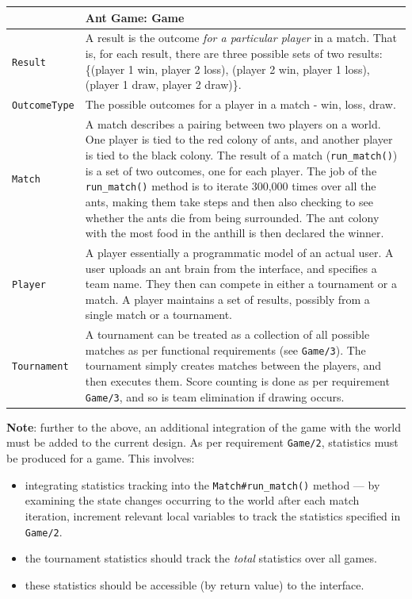 \documentclass[11pt]{article}
\begin{document}
\begin{longtable}[c]{@{}p{}p{}@{}}
\toprule
& Ant Game: Game \tabularnewline
\midrule
\texttt{Result} & A result is the outcome \textit{for a particular player} in a match. That is, for each result, there are three possible sets of two results: \{(player 1 win, player 2 loss), (player 2 win, player 1 loss), (player 1 draw, player 2 draw)\}. \tabularnewline
\texttt{OutcomeType} & The possible outcomes for a player in a match - win, loss, draw. \tabularnewline
\texttt{Match} & A match describes a pairing between two players on a world. One player is tied to the red colony of ants, and another player is tied to the black colony. The result of a match (\texttt{run\_match()}) is a set of two outcomes, one for each player. The job of the \texttt{run\_match()} method is to iterate 300,000 times over all the ants, making them take steps and then also checking to see whether the ants die from being surrounded. The ant colony with the most food in the anthill is then declared the winner. \tabularnewline
\texttt{Player} & A player essentially a programmatic model of an actual user. A user uploads an ant brain from the interface, and specifies a team name. They then can compete in either a tournament or a match. A player maintains a set of results, possibly from a single match or a tournament. \tabularnewline
\texttt{Tournament} & A tournament can be treated as a collection of all possible matches as per functional requirements (see \texttt{Game/3}). The tournament simply creates matches between the players, and then executes them. Score counting is done as per requirement \texttt{Game/3}, and so is team elimination if drawing occurs. \tabularnewline
\bottomrule
\end{longtable}

\textbf{Note}: further to the above, an additional integration of the game with the world must be added to the current design. As per requirement \texttt{Game/2}, statistics must be produced for a game. This involves:
\begin{itemize}
\item integrating statistics tracking into the \texttt{Match\#run\_match()} method --- by examining the state changes occurring to the world after each match iteration, increment relevant local variables to track the statistics specified in \texttt{Game/2}.
\item the tournament statistics should track the \textit{total} statistics over all games.
\item these statistics should be accessible (by return value) to the interface. 
\end{itemize}
\end{document}
